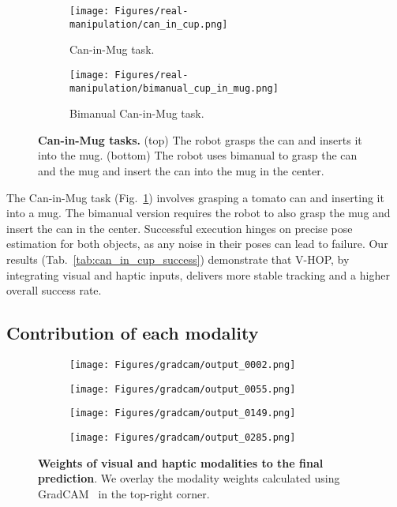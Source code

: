\documentclass[11pt, a4paper, logo, twocolumn]{brown}
\begin{document}
\begin{figure}[h!]
    \centering
    \begin{subfigure}{\linewidth}
        \texttt{[image: Figures/real-manipulation/can\_in\_cup.png]}
        \caption{Can-in-Mug task.}
    \end{subfigure}
    \begin{subfigure}{\linewidth}
        \texttt{[image: Figures/real-manipulation/bimanual\_cup\_in\_mug.png]}
        \caption{Bimanual Can-in-Mug task.}
    \end{subfigure}
    \caption{
    \textbf{Can-in-Mug tasks.}
    (top) The robot grasps the can and inserts it into the mug.
    (bottom) The robot uses bimanual to grasp the can and the mug and insert the can into the mug in the center.
    }
    \label{fig:can-in-mug}
\end{figure}

The Can-in-Mug task (Fig.~\ref{fig:can-in-mug}) involves grasping a tomato can and inserting it into a mug. 
The bimanual version requires the robot to also grasp the mug and insert the can in the center.
Successful execution hinges on precise pose estimation for both objects, as any noise in their poses can lead to failure. 
Our results (Tab.~\ref{tab:can_in_cup_success}) demonstrate that V-HOP, by integrating visual and haptic inputs, delivers more stable tracking and a higher overall success rate.


\subsection{Contribution of each modality}
\begin{figure}[t!]
    \centering
    \begin{subfigure}{.48\linewidth}
        \centering
        \texttt{[image: Figures/gradcam/output\_0002.png]}
    \end{subfigure}
    \begin{subfigure}{.48\linewidth}
        \centering
        \texttt{[image: Figures/gradcam/output\_0055.png]}
    \end{subfigure}
    \begin{subfigure}{.48\linewidth}
        \centering
        \texttt{[image: Figures/gradcam/output\_0149.png]}
    \end{subfigure}
    \begin{subfigure}{.48\linewidth}
        \centering
        \texttt{[image: Figures/gradcam/output\_0285.png]}
    \end{subfigure}
    \caption{\textbf{Weights of visual and haptic modalities to the final prediction}.
    We overlay the modality weights calculated using GradCAM~\cite{selvaraju_grad-cam_2020} in the top-right corner.
    }
    \label{fig:modality-weight}
\end{figure}
\end{document}
